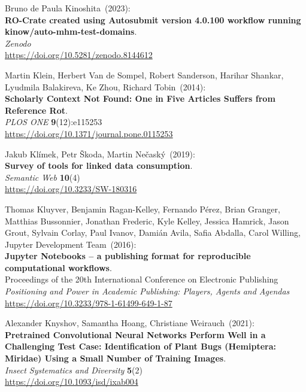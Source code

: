 \begin{thebibliography}{9}
Bruno de Paula Kinoshita~(2023): \\
\textbf{RO-Crate created using Autosubmit version 4.0.100 workflow running kinow/auto-mhm-test-domains}.\\
\emph{Zenodo}\\
\url{https://doi.org/10.5281/zenodo.8144612}

Martin Klein, Herbert Van de Sompel, Robert Sanderson, Harihar Shankar, Lyudmila Balakireva, Ke Zhou, Richard Tobin~(2014): \\
\textbf{Scholarly Context Not Found: One in Five Articles Suffers from Reference Rot}.\\
\emph{PLOS ONE} \textbf{9}(12):e115253\\
\url{https://doi.org/10.1371/journal.pone.0115253}

Jakub Klímek, Petr Škoda, Martin Nečaský~(2019): \\
\textbf{Survey of tools for linked data consumption}. \\
\emph{Semantic Web} \textbf{10}(4) \\
\url{https://doi.org/10.3233/SW-180316}

Thomas Kluyver, Benjamin Ragan-Kelley, Fernando Pérez, Brian Granger, Matthias Bussonnier, Jonathan Frederic, Kyle Kelley, Jessica Hamrick, Jason Grout, Sylvain Corlay, Paul Ivanov, Damián Avila, Safia Abdalla, Carol Willing, Jupyter Development Team~(2016): \\
\textbf{Jupyter Notebooks – a publishing format for reproducible computational workflows}.\\
Proceedings of the 20th International Conference on Electronic Publishing\\
\emph{Positioning and Power in Academic Publishing: Players, Agents and Agendas}\\ 
\url{https://doi.org/10.3233/978-1-61499-649-1-87}

Alexander Knyshov, Samantha Hoang, Christiane Weirauch~(2021): \\
\textbf{Pretrained Convolutional Neural Networks Perform Well in a Challenging Test Case: Identification of Plant Bugs (Hemiptera: Miridae) Using a Small Number of Training Images}. \\
\emph{Insect Systematics and Diversity} \textbf{5}(2)\\
\url{https://doi.org/10.1093/isd/ixab004}


\end{thebibliography}
